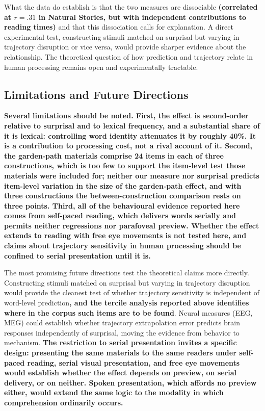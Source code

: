 \documentclass[12pt]{article}
\newcommand{\new}[1]{{\bfseries #1}}
\begin{document}
What the data do establish is that the two measures are dissociable \new{(correlated at $r = .31$ in Natural Stories, but with independent contributions to reading times)} and that this dissociation calls for explanation. A direct experimental test, constructing stimuli matched on surprisal but varying in trajectory disruption or vice versa, would provide sharper evidence about the relationship. The theoretical question of how prediction and trajectory relate in human processing remains open and experimentally tractable.

\subsection{Limitations and Future Directions}

\new{Several limitations should be noted. First, the effect is second-order relative to surprisal and to lexical frequency, and a substantial share of it is lexical: controlling word identity attenuates it by roughly 40\%. It is a contribution to processing cost, not a rival account of it. Second, the garden-path materials comprise 24 items in each of three constructions, which is too few to support the item-level test those materials were included for; neither our measure nor surprisal predicts item-level variation in the size of the garden-path effect, and with three constructions the between-construction comparison rests on three points. Third, all of the behavioural evidence reported here comes from self-paced reading, which delivers words serially and permits neither regressions nor parafoveal preview. Whether the effect extends to reading with free eye movements is not tested here, and claims about trajectory sensitivity in human processing should be confined to serial presentation until it is.}

The most promising future directions test the theoretical claims more directly. Constructing stimuli matched on surprisal but varying in trajectory disruption would provide the cleanest test of whether trajectory sensitivity is independent of word-level prediction\new{, and the tercile analysis reported above identifies where in the corpus such items are to be found}. Neural measures (EEG, MEG) could establish whether trajectory extrapolation error predicts brain responses independently of surprisal, moving the evidence from behavior to mechanism. \new{The restriction to serial presentation invites a specific design: presenting the same materials to the same readers under self-paced reading, serial visual presentation, and free eye movements would establish whether the effect depends on preview, on serial delivery, or on neither. Spoken presentation, which affords no preview either, would extend the same logic to the modality in which comprehension ordinarily occurs.}
\end{document}
